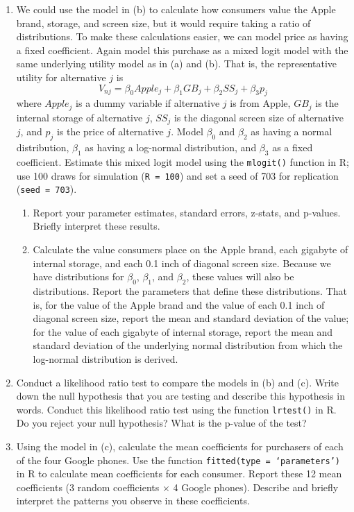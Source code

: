 \documentclass[11pt,letterpaper]{article}
\begin{document}
\begin{enumerate}[label=\alph*., leftmargin=*]
	\item We could use the model in (b) to calculate how consumers value the Apple brand, storage, and screen size, but it would require taking a ratio of distributions. To make these calculations easier, we can model price as having a fixed coefficient. Again model this purchase as a mixed logit model with the same underlying utility model as in (a) and (b). That is, the representative utility for alternative $j$ is
	$$V_{nj} = \beta_0 Apple_j + \beta_1 GB_j + \beta_2 SS_j + \beta_3 p_j$$
	where $Apple_j$ is a dummy variable if alternative $j$ is from Apple, $GB_j$ is the internal storage of alternative $j$, $SS_j$ is the diagonal screen size of alternative $j$, and $p_j$ is the price of alternative $j$. Model $\beta_0$ and $\beta_2$ as having a normal distribution, $\beta_1$ as having a log-normal distribution, and $\beta_3$ as a fixed coefficient. Estimate this mixed logit model using the \texttt{mlogit()} function in R; use 100 draws for simulation (\texttt{R = 100}) and set a seed of 703 for replication (\texttt{seed = 703}).
	\begin{enumerate}[label=\roman*.]
		\item Report your parameter estimates, standard errors, z-stats, and p-values. Briefly interpret these results. 
		\item Calculate the value consumers place on the Apple brand, each gigabyte of internal storage, and each 0.1 inch of diagonal screen size. Because we have distributions for $\beta_0$, $\beta_1$, and $\beta_2$, these values will also be distributions. Report the parameters that define these distributions. That is, for the value of the Apple brand and the value of each 0.1 inch of diagonal screen size, report the mean and standard deviation of the value; for the value of each gigabyte of internal storage, report the mean and standard deviation of the underlying normal distribution from which the log-normal distribution is derived.
	\end{enumerate}

	\item Conduct a likelihood ratio test to compare the models in (b) and (c). Write down the null hypothesis that you are testing and describe this hypothesis in words. Conduct this likelihood ratio test using the function \texttt{lrtest()} in R. Do you reject your null hypothesis? What is the p-value of the test?

	\item Using the model in (c), calculate the mean coefficients for purchasers of each of the four Google phones. Use the function \texttt{fitted(type = `parameters')} in R to calculate mean coefficients for each consumer. Report these 12 mean coefficients (3 random coefficients $\times$ 4 Google phones). Describe and briefly interpret the patterns you observe in these coefficients.
\end{enumerate}
\end{document}
